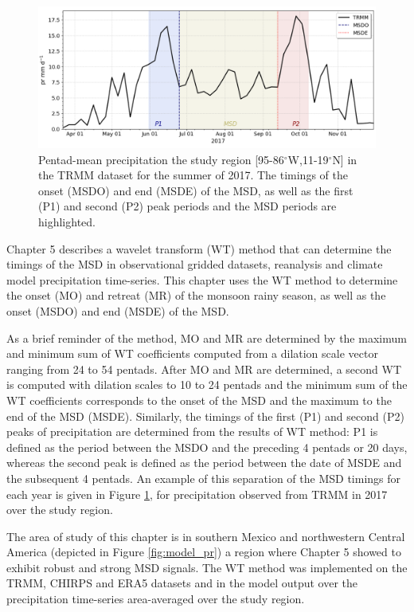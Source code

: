  \begin{figure}[t!]
\includegraphics[width=\linewidth]{figures/explain_fig_msd.png}
\caption[Illustration of the use of the wavelet transform method]{Pentad-mean precipitation the study region [95-86$^\circ$W,11-19$^\circ$N] in the TRMM dataset for the summer of 2017. The timings of the onset (MSDO) and end (MSDE) of the MSD, as well as the first (P1) and second (P2) peak periods and the MSD periods are highlighted. }
\label{fig:explain_msd}
\end{figure}

Chapter 5 describes a wavelet transform (WT) method that can determine the timings of the MSD in observational gridded datasets, reanalysis and climate model precipitation time-series. 
This chapter uses the WT method to determine the onset (MO) and retreat (MR) of the monsoon rainy season, as well as the onset  (MSDO) and end (MSDE) of the MSD. 

As a brief reminder of the method, MO and MR are determined by the maximum and minimum sum of WT coefficients computed from a dilation scale vector ranging from 24 to 54 pentads. After MO and MR are determined, a second WT is computed with dilation scales to 10 to 24 pentads and the minimum sum of the WT coefficients corresponds to the onset of the MSD and the maximum to the end of the MSD (MSDE). 
Similarly, the timings of the first (P1) and second (P2) peaks of precipitation are determined from the results of WT method: P1 is defined as the period between the MSDO and the preceding 4 pentads or 20 days, whereas the second peak is defined as the period between the date of MSDE and the subsequent 4 pentads. An example of this separation of the MSD timings for each year is given in Figure \ref{fig:explain_msd}, for precipitation observed from TRMM in 2017 over the study region.

The area of study of this chapter is in southern Mexico and northwestern Central America (depicted in Figure \ref{fig:model_pr}) a region where Chapter 5 showed to exhibit robust and strong MSD signals. The WT method was implemented on the TRMM, CHIRPS and ERA5 datasets and in the model output over the precipitation time-series area-averaged over the study region. 


